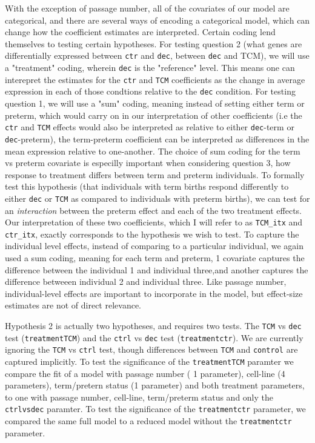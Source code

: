 \begin{itemize}
With the exception of passage number, all of the covariates of our model are categorical, and there are several ways of encoding a categorical model, which can change how the coefficient estimates are interpreted.
Certain coding lend themselves to testing certain hypotheses.  For testing question 2 (what genes are differentially expressed between \texttt{ctr} and \texttt{dec}, between \texttt{dec} and TCM), we will use a "treatment" coding,
wherein \texttt{dec} is the "reference" level.  This means one can interepret the estimates for the \texttt{ctr} and \texttt{TCM} coefficients as the change in average expression in each of those condtions relative to the \texttt{dec} condition.
For testing question 1, we will use a "sum" coding, meaning instead of setting either term or preterm, which would carry on in our interpretation of other coefficients (i.e the \texttt{ctr} and \texttt{TCM} effects would also be 
interpreted as relative to either \texttt{dec}-term or \texttt{dec}-preterm), the term-preterm coefficient can be interpreted as differences in the mean expression relative to one-another.  The choice of sum coding for the term vs preterm covariate 
is especilly important when considering question 3, how response to treatment differs between term and preterm individuals.  To formally test this hypothesis (that individuals with term births respond differently to either \texttt{dec} or \texttt{TCM} as compared to 
individuals with preterm births), we can test for an \emph{interaction} between the preterm effect and each of the two treatment effects.  Our interpretation of these two coefficients, which I will refer to as \texttt{TCM\_itx} and \texttt{ctr\_itx},
exactly corresponds to the hypothesis we wish to test.  To capture the individual level effects, instead of comparing to a particular individual, we again used a sum coding, meaning for each term and preterm, 
1 covariate captures the difference between the individual 1 and individual three,and another captures the difference betweeen individual 2 and individual three.  Like passage number, individual-level effects are important to
incorporate in the model, but effect-size estimates are not of direct relevance.

Hypothesis 2 is actually two hypotheses, and requires two tests. The \texttt{TCM} vs \texttt{dec} test (\texttt{treatmentTCM}) and the \texttt{ctrl} vs \texttt{dec} test (\texttt{treatmentctr}).
We are currently ignoring the \texttt{TCM} vs \texttt{ctrl} test, though differences between \texttt{TCM} and \texttt{control} are captured implicitly.  To test the significance of the \texttt{treatmentTCM} paramter we compare the fit of a model with passage number ( 1 parameter), cell-line (4 parameters), term/pretern status (1 parameter) and both treatment parameters, to one with passage number, cell-line, term/preterm status and only the \texttt{ctrlvsdec} paramter.
To test the significance of the \texttt{treatmentctr} parameter, we compared the same full model to a reduced model without the \texttt{treatmentctr} parameter.



\end{itemize}
